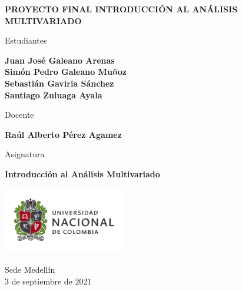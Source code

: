 \begin{titlepage}
   \Large{
   \begin{center}
       \vspace*{1cm}

       \textbf{PROYECTO FINAL INTRODUCCIÓN AL ANÁLISIS MULTIVARIADO}

            
       \vspace{1cm}
       
       Estudiantes
       
       \vspace{0.5cm}
        
        
       \textbf{Juan José Galeano Arenas} \\
       \textbf{Simón Pedro Galeano Muñoz} \\
       \textbf{Sebastián Gaviria Sánchez} \\
       \textbf{Santiago Zuluaga Ayala} \\
       
              \vspace{1cm}
       
       Docente
       
       \vspace{0.5cm}

       \textbf{Raúl Alberto Pérez Agamez}
       
       \vspace{0.4cm}

       \vspace{1.5cm}
       
       Asignatura
       
       \vspace{0.5cm}

       \textbf{Introducción al Análisis Multivariado}

       \vfill

            
       \vspace{0.1cm}
     
       \includegraphics[width=0.4\textwidth]{logounal.png}
            
       Sede Medellín\\
       3 de septiembre de 2021
       
   \end{center}
   }
\end{titlepage}